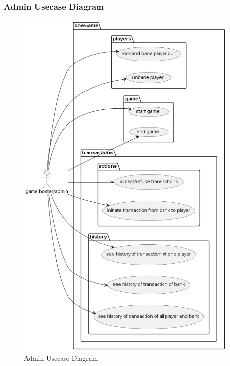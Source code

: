 \documentclass{article}
\begin{document}
\cleardoublepage
\subsubsection{Admin Usecase Diagram}
\begin{figure}[H]
	\centering
	\includegraphics[height=7in]{../thesis_tex/assets/diagrams/admin_ucd.png}
	\caption{Admin Usecase Diagram}
\end{figure}
\cleardoublepage

\cleardoublepage
\end{document}
